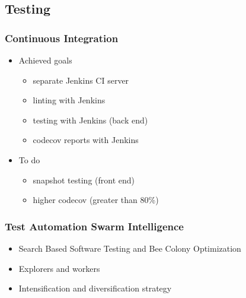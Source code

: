 \documentclass[12pt]{beamer}
\begin{document}
    \subsection{Testing}
    \begin{frame}
        \frametitle{Continuous Integration}
        \begin{itemize}
            \item Achieved goals
            \begin{itemize}
                \item separate Jenkins CI server
                \item linting with Jenkins
                \item testing with Jenkins (back end)
                \item codecov reports with Jenkins
            \end{itemize}
            \item To do
            \begin{itemize}
                \item snapshot testing (front end)
                \item higher codecov (greater than 80\%)
            \end{itemize}
        \end{itemize}
    \end{frame}

    \begin{frame}
        \frametitle{Test Automation Swarm Intelligence}
        \begin{itemize}
            \item Search Based Software Testing and Bee Colony Optimization
            \item Explorers and workers
            \item Intensification and diversification strategy
        \end{itemize}
    \end{frame}
\end{document}
